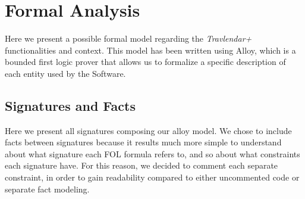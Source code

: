 \chapter{Formal Analysis}
    
    Here we present a possible formal model regarding the \emph{Travlendar+} functionalities and context. This model has been written using Alloy, which is a bounded first logic prover that allows us to formalize a specific description of each entity used by the Software.
    
    \section{Signatures and Facts}
        Here we present all signatures composing our alloy model. We chose to include facts between signatures because it results much more simple to understand about what signature each FOL formula refers to, and so about what constraints each signature have. For this reason, we decided to comment each separate constraint, in order to gain readability compared to either uncommented code or separate fact modeling.
  
